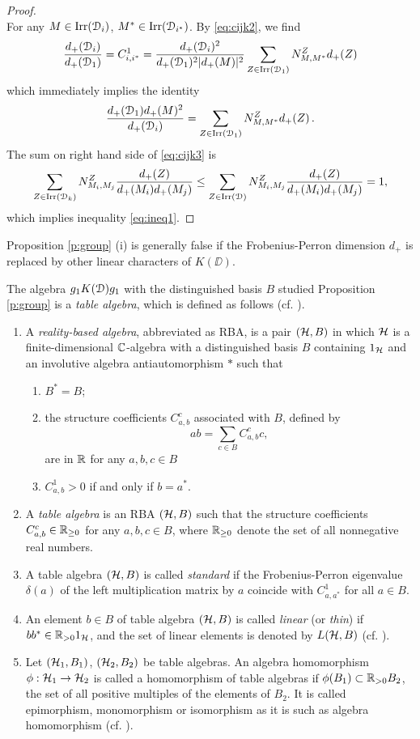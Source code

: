 \documentclass{amsart}
\begin{document}
\begin{proof}
\begin{equation}
\end{equation}
For any $M \in \operatorname{Irr}({\EuScript{D}}_i)$, $M^* \in \operatorname{Irr}({\EuScript{D}}_{i^*})$.  By \eqref{eq:cijk2}, we find 
 $$\frac{{d_+}({\EuScript{D}}_i)}{{d_+}({\EuScript{D}}_1)} =C_{i, i^*}^1 = \frac{{d_+}({\EuScript{D}}_i)^2}{{d_+}({\EuScript{D}}_1)^2|{d_+}(M)|^2}\sum_{Z\in\operatorname{Irr}({\EuScript{D}}_1)}N_{M,M^*}^Z {d_+}(Z)
 $$
 which immediately implies the identity
 $$
 \frac{{d_+}({\EuScript{D}}_1){d_+}(M)^2}{{d_+}({\EuScript{D}}_i)} = \sum_{Z\in\operatorname{Irr}({\EuScript{D}}_1)}N_{M,M^*}^Z {d_+}(Z)\,. 
 $$
 The  sum on right hand side of \eqref{eq:cijk3} is 
$$
\sum_{Z \in \operatorname{Irr}({\EuScript{D}}_k)} N_{M_i, M_j}^Z \frac{d_+(Z)}{d_+(M_i)d_+(M_j)} \le \sum_{Z \in \operatorname{Irr}({\EuScript{D}})} N_{M_i, M_j}^Z \frac{d_+(Z)}{d_+(M_i)d_+(M_j)} = 1,
$$
which implies  inequality  \eqref{eq:ineq1}.
\end{proof}

\begin{rmk}\label{r6.2} Proposition \ref{p:group} (i) is generally false if the Frobenius-Perron dimension $d_+$ is replaced by other linear characters of $K(\DD)$.
\end{rmk}
The algebra $g_1 {K({\EuScript{D}})} g_1$ with the distinguished basis $B$ studied Proposition \ref{p:group} is a \emph{table algebra}, which is defined as follows  (cf. \cite{Bl}).
\begin{defn} \label{d:RBA_TA}
\begin{enumerate}
\item A \emph{reality-based algebra}, abbreviated as RBA, is a pair $(\mathcal{H}, B)$ in which $\mathcal{H}$ is a finite-dimensional $\mathbb{C}$-algebra with a distinguished basis $B$ containing $1_{\mathcal{H}}$ and an involutive algebra antiautomorphism $*$ such that
\begin{enumerate}
    \item $B^* = B$;
    \item the structure coefficients $C_{a,b}^c$ associated with $B$, defined by
    $$
    ab = \sum_{c \in B} C_{a,b}^c c,
    $$
    are in $\mathbb{R}$ for any $a,b,c \in B$
    \item  $C_{a,b}^1 > 0$ if and only if $b=a^*$.
\end{enumerate}
    \item A \emph{table algebra} is an RBA $(\mathcal{H},B)$ such that the structure coefficients $C_{a,b}^c \in {\mathbb{R}_{\ge 0}}$ for any $a,b,c \in B$, where $\mathbb{R}_{\ge 0}$ denote the set of all nonnegative real numbers.
\item A table algebra $(\mathcal{H}, B)$ is called \emph{standard} if the Frobenius-Perron eigenvalue $\delta(a)$ of the left multiplication matrix by $a$ coincide with $C_{a,a^*}^1$ for all $a \in B$.
\item An element $b \in B$ of table algebra $(\mathcal{H}, B)$ is called \emph{linear} (or \emph{thin}) if $bb^*\in \mathbb{R}_{>0}1_{\mathcal{H}}$, and the set of linear elements is denoted by $L(\mathcal{H},B)$ (cf. \cite[Def. 3.14]{Bl}).
\item Let $(\mathcal{H}_1, B_1)$, $(\mathcal{H}_2, B_2)$ be table algebras. An algebra homomorphism $\phi: \mathcal{H}_1 \to \mathcal{H}_2$ is called a homomorphism of table algebras if $\phi(B_1) \subset \mathbb{R}_{> 0} B_2$, the set of all positive multiples of the elements of $B_2$. It is called epimorphism, monomorphism or isomorphism as it is such as algebra homomorphism (cf. \cite[Def. 3.11]{Bl}).
\end{enumerate}
\end{defn}
\end{document}

